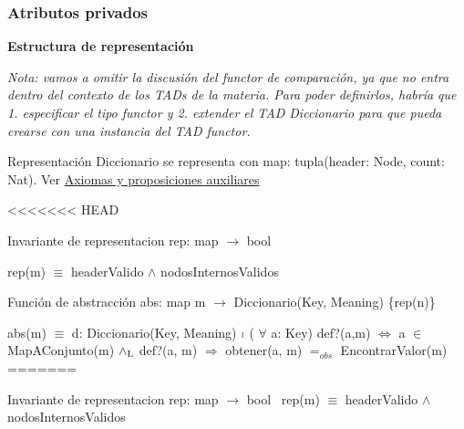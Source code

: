\subsubsection*{Atributos privados}
\begin{Indent}\textbf{ Estructura de representación}\par
{\em Nota\+: vamos a omitir la discusión del functor de comparación, ya que no entra dentro del contexto de los T\+A\+Ds de la materia. Para poder definirlos, habría que 1. especificar el tipo functor y 2. extender el T\+AD Diccionario para que pueda crearse con una instancia del T\+AD functor.

\begin{DoxyParagraph}{Representación}
Diccionario se representa con map\+: tupla(header\+: Node, count\+: Nat). Ver \hyperlink{axiomas}{Axiomas y proposiciones auxiliares}
\end{DoxyParagraph}
<<<<<<< HEAD
\begin{DoxyParagraph}{\-Invariante de representacion}
rep\-: map $\to$ bool\par
 rep(m) $\equiv$ header\-Valido $\land$ nodos\-Internos\-Validos 
\end{DoxyParagraph}
\begin{DoxyParagraph}{\-Función de abstracción}
abs\-: map m $\to$ \-Diccionario(\-Key, \-Meaning) \{rep(n)\}\par
 abs(m) $\equiv$ d\-: \-Diccionario(\-Key, \-Meaning) $\shortmid$ ( $\forall$ a\-: \-Key) def?(a,m) $\Leftrightarrow$ a $\in$ \-Map\-A\-Conjunto(m) $\land_{\rm L}$ def?(a, m) $\Rightarrow$ obtener(a, m) $=_{obs}$ \-Encontrar\-Valor(m)  
=======
\begin{DoxyParagraph}{Invariante de representacion}
rep\+: map $\to$ bool~\newline
rep(m) $\equiv$ header\+Valido $\land$ nodos\+Internos\+Validos 
\end{DoxyParagraph}



\end{DoxyParagraph}}
\end{Indent}
